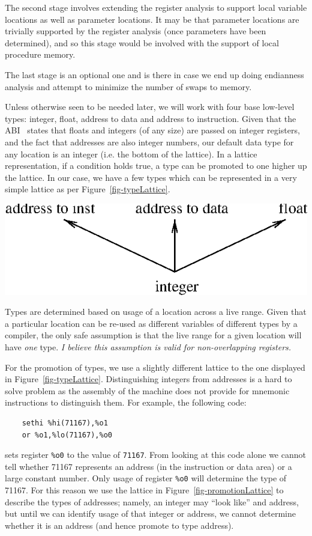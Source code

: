 The second stage involves extending the register analysis to 
support local variable locations as well as parameter locations. 
It may be that parameter locations are trivially supported by
the register analysis (once parameters have been determined), 
and so this stage would be involved with the support of 
local procedure memory.

The last stage is an optional one and is there in case we end 
up doing endianness analysis and attempt to minimize the number
of swaps to memory.  

Unless otherwise seen to be needed later, we will work with 
four base low-level types: integer, float, address to data 
and address to instruction.  
Given that the ABI~\cite{Unix90} states that floats and 
integers (of any size) are passed on integer registers, and the  
fact that addresses are also integer numbers, our default data type
for any location is an integer (i.e. the bottom of the lattice).  
In a lattice representation, if a condition holds true, a type can 
be promoted to one higher up the lattice.  In our case, we have a 
few types which can be represented in a very simple lattice as per 
Figure~\ref{fig-typeLattice}. 

\centerfigbegin
{\includegraphics{figures/typeLattice.eps}}

Types are determined based on usage of a location across a live
range.  Given that a particular location can be re-used as 
different variables of different types by a compiler, the only
safe assumption is that the live range for a given location will 
have \emph{one} type.  {\emph{I believe this assumption is 
valid for non-overlapping registers.}} 

For the promotion of types, we use a slightly different lattice
to the one displayed in Figure~\ref{fig-typeLattice}.  Distinguishing
integers from addresses is a hard to solve problem as the assembly 
of the machine does not provide for mnemonic instructions to 
distinguish them.  For example, the following code: 
\begin{verbatim}
    sethi %hi(71167),%o1
    or %o1,%lo(71167),%o0
\end{verbatim}
sets register \texttt{\%o0} to the value of \texttt{71167}.  From 
looking at this code alone we cannot tell whether 71167 represents
an address (in the instruction or data area) or a large constant 
number.  Only usage of register \texttt{\%o0} will determine 
the type of 71167.  
For this reason we use the lattice in Figure~\ref{fig-promotionLattice} 
to describe the types of addresses; namely, an integer may ``look like'' 
and address, but until we can identify usage of that integer or 
address, we cannot determine whether it is an address (and hence 
promote to type address). 

